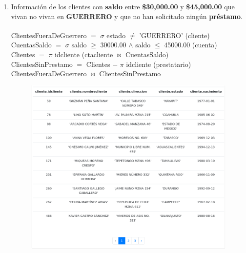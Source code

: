 \documentclass{exam}
\begin{document}
\begin{questions}
\begin{enumerate}[label=\alph*.]
		
		\newpage
		\item Información de los clientes con \textbf{saldo} entre \textbf{\$30,000.00} y \textbf{\$45,000.00} que vivan no vivan en \textbf{GUERRERO} y que no han solicitado ningún \textbf{préstamo}.\\\\
		ClientesFueraDeGuerrero $=$ $\sigma$ estado $\neq$ 'GUERRERO' (cliente)\\
		CuentasSaldo $=$ $\sigma$ saldo $\geqslant$ 30000.00 $\wedge$ saldo $\leqslant$ 45000.00 (cuenta)\\
		Clientes $=$ $\pi$ idcliente (ctacliente $\bowtie$ CuentasSaldo)\\
		ClientesSinPrestamo $=$ Clientes $-$ $\pi$ idcliente (prestatario)\\
		ClientesFueraDeGuerrero $\bowtie$ ClientesSinPrestamo\\
		\begin{center}
		\begin{figure}[h!]
			\includegraphics[width=17cm]{imgs/2g.png}
			\centering
		\end{figure}	
		\end{center}
		

\end{enumerate}
\end{questions}
\end{document}
